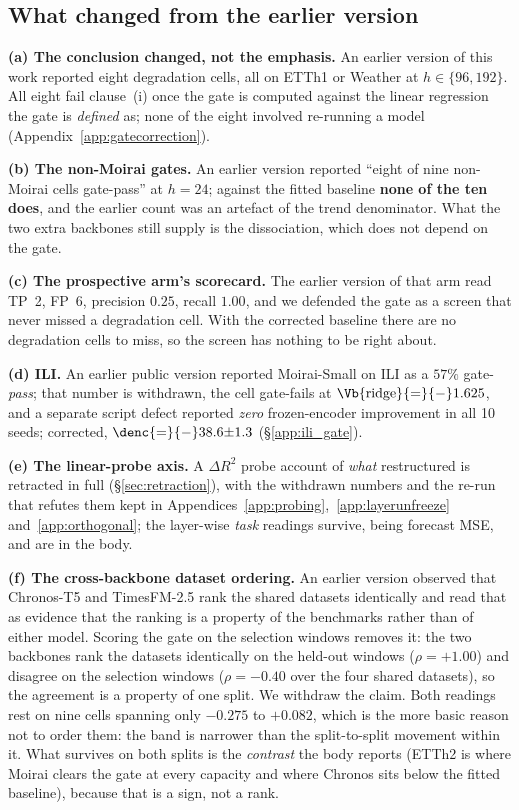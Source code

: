 \subsection{What changed from the earlier version}
\label{app:corrections}

\textbf{(a) The conclusion changed, not the emphasis.} An earlier version of this
work reported eight degradation cells, all on ETTh1 or Weather at
$h{\in}\{96,192\}$.  All eight fail clause~(i) once the gate is computed against
the linear regression the gate is \emph{defined} as; none of the eight involved
re-running a model (Appendix~\ref{app:gatecorrection}).

\textbf{(b) The non-Moirai gates.} An earlier version reported ``eight of nine
non-Moirai cells gate-pass'' at $h{=}24$; against the fitted baseline
\textbf{none of the ten does}, and the earlier count was an artefact of the trend
denominator.  What the two extra backbones still supply is the dissociation,
which does not depend on the gate.

\textbf{(c) The prospective arm's scorecard.} The earlier version of that arm read
TP~2, FP~6, precision $0.25$, recall $1.00$, and we defended the gate as a screen
that never missed a degradation cell.  With the corrected baseline there are no
degradation cells to miss, so the screen has nothing to be right about.

\textbf{(d) ILI.} An earlier public version reported Moirai-Small on ILI as a
$57\%$ gate-\emph{pass}; that number is withdrawn, the cell gate-fails at
$\Vb{\text{ridge}}{=}{-}1.625$, and a separate script defect reported \emph{zero}
frozen-encoder improvement in all 10 seeds; corrected, $\denc{=}{-}38.6{\pm}1.3$
(\S\ref{app:ili_gate}).

\textbf{(e) The linear-probe axis.} A $\Delta R^2$ probe account of \emph{what}
restructured is retracted in full (\S\ref{sec:retraction}), with the withdrawn
numbers and the re-run that refutes them kept in
Appendices~\ref{app:probing},~\ref{app:layerunfreeze} and~\ref{app:orthogonal};
the layer-wise \emph{task} readings survive, being forecast MSE, and are in the body.

\textbf{(f) The cross-backbone dataset ordering.} An earlier version observed that
Chronos-T5 and TimesFM-2.5 rank the shared datasets identically and read that as
evidence that the ranking is a property of the benchmarks rather than of either
model. Scoring the gate on the selection windows removes it: the two backbones rank
the datasets identically on the held-out windows ($\rho{=}{+}1.00$) and disagree on the
selection windows ($\rho{=}{-}0.40$ over the four shared datasets), so the agreement
is a property of one split. We withdraw the claim. Both readings rest on nine cells
spanning only $-0.275$ to $+0.082$, which is the more basic reason not to order them:
the band is narrower than the split-to-split movement within it. What survives on both
splits is the \emph{contrast} the body reports (ETTh2 is where Moirai clears the gate
at every capacity and where Chronos sits below the fitted baseline), because that is a
sign, not a rank.

